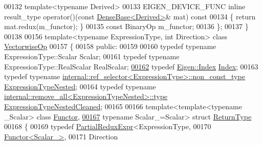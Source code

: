 \begin{DoxyCode}
00132   \textcolor{keyword}{template}<\textcolor{keyword}{typename} Derived>
00133   EIGEN\_DEVICE\_FUNC \textcolor{keyword}{inline} result\_type operator()(\textcolor{keyword}{const} \hyperlink{group___core___module_class_eigen_1_1_dense_base}{DenseBase<Derived>}& mat)\textcolor{keyword}{ const}
00134 \textcolor{keyword}{  }\{ \textcolor{keywordflow}{return} mat.redux(m\_functor); \}
00135   \textcolor{keyword}{const} BinaryOp m\_functor;
00136 \};
00137 \}
00138 
00156 \textcolor{keyword}{template}<\textcolor{keyword}{typename} ExpressionType, \textcolor{keywordtype}{int} Direction> \textcolor{keyword}{class }\hyperlink{group___core___module_class_eigen_1_1_vectorwise_op}{VectorwiseOp}
00157 \{
00158   \textcolor{keyword}{public}:
00159 
00160     \textcolor{keyword}{typedef} \textcolor{keyword}{typename} ExpressionType::Scalar Scalar;
00161     \textcolor{keyword}{typedef} \textcolor{keyword}{typename} ExpressionType::RealScalar RealScalar;
\hyperlink{group___core___module_a4907c654e5810edd98e4162093b19532}{00162}     \textcolor{keyword}{typedef} \hyperlink{namespace_eigen_a62e77e0933482dafde8fe197d9a2cfde}{Eigen::Index} \hyperlink{group___core___module_a4907c654e5810edd98e4162093b19532}{Index}; 
00163     \textcolor{keyword}{typedef} \textcolor{keyword}{typename} \hyperlink{class_eigen_1_1internal_1_1_tensor_lazy_evaluator_writable}{internal::ref\_selector<ExpressionType>::non\_const\_type}
       \hyperlink{class_eigen_1_1internal_1_1_tensor_lazy_evaluator_writable}{ExpressionTypeNested};
00164     \textcolor{keyword}{typedef} \textcolor{keyword}{typename} \hyperlink{group___sparse_core___module}{internal::remove\_all<ExpressionTypeNested>::type}
       \hyperlink{group___sparse_core___module}{ExpressionTypeNestedCleaned};
00165 
00166     \textcolor{keyword}{template}<\textcolor{keyword}{template}<\textcolor{keyword}{typename} \_Scalar> \textcolor{keyword}{class }\hyperlink{struct_functor}{Functor},
\hyperlink{struct_eigen_1_1_vectorwise_op_1_1_return_type}{00167}                       \textcolor{keyword}{typename} Scalar\_=Scalar> \textcolor{keyword}{struct }\hyperlink{struct_eigen_1_1_vectorwise_op_1_1_return_type}{ReturnType}
00168     \{
00169       \textcolor{keyword}{typedef} \hyperlink{group___core___module_class_eigen_1_1_partial_redux_expr}{PartialReduxExpr}<ExpressionType,
00170                                \hyperlink{struct_functor}{Functor<Scalar\_>},
00171                                Direction

\end{DoxyCode}
